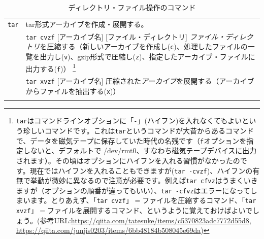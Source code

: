 \documentclass[a4j]{ltjreport}
\begin{document}
\begin{longtable}[c]{|p{3.5cm}|p{13.5cm}|}
        \texttt{tar} &tar形式アーカイブを作成・展開する。\\
        &\texttt{tar cvzf} [アーカイブ名] [ファイル・ディレクトリ] \emph{ファイル・ディレクトリ}を圧縮する（新しいアーカイブを作成し(\texttt{c})、処理したファイルの一覧を出力し(\texttt{v})、gzip形式で圧縮し(\texttt{z})、指定したアーカイブ・ファイルに出力する(\texttt{f})）
        \footnote{\texttt{tar}はコマンドラインオプションに「\texttt{-}」(ハイフン)を入れなくてもよいという珍しいコマンドです。これは\texttt{tar}というコマンドが大昔からあるコマンドで、データを磁気テープに保存していた時代の名残です（\texttt{f}オプションを指定しないと、デフォルトで /dev/rmt0、すなわち磁気テープデバイスに出力されます）。その頃はオプションにハイフンを入れる習慣がなかったのです。現在ではハイフンを入れることもできますが(\texttt{tar -cvzf})、ハイフンの有無で挙動が微妙に異なるので注意が必要です。例えば\texttt{tar cfvz}はうまくいきますが（オプションの順番が違ってもいい）、\texttt{tar -cfvz}はエラーになってしまいます。とりあえず、「\texttt{tar cvzf}」$=$ファイルを圧縮するコマンド、「\texttt{tar xvzf}」$=$ファイルを展開するコマンド、というように覚えておけばよいでしょう。(参考URL:\url{https://qiita.com/tatesuke/items/c5370823adc7772d55d8}, \url{https://qiita.com/junjis0203/items/6bb48184b508045e69da})} \\
        &\texttt{tar xvzf} [アーカイブ名] 圧縮された\emph{アーカイブ}を展開する（アーカイブからファイルを抽出する(\texttt{x})）\\
        \hline
    
        \caption{ディレクトリ・ファイル操作のコマンド}
    \end{longtable}
    
\end{document}
